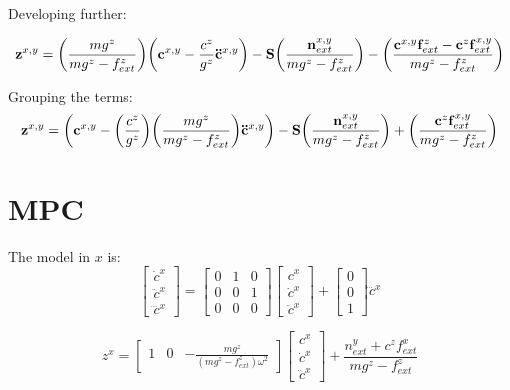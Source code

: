Developing further:

\begin{equation}
 \zmp^{x,y}
 =
 \left( \frac{m g^z}{m g^z - f^z_{ext}} \right)
 \left( \comP^{x,y} - \frac{c^z}{g^z} \comA^{x,y} \right)
 -
 \mathbf{S}
 \left( \frac{\tExt^{x,y} }{mg^z - f^z_{ext}} \right)
 -
 \left( \frac{\comP^{x,y}\fExt^z - \comP^z\fExt^{x,y}}{mg^z - f^z_{ext}} \right)
\end{equation}

Grouping the terms:
\begin{equation}
 \zmp^{x,y}
 =
 \left( \comP^{x,y} - \left( \frac{c^z}{g^z} \right) \left( \frac{m g^z }{m g^z - f^z_{ext}} \right) \comA^{x,y}  \right)
 -
 \mathbf{S}
 \left( \frac{\tExt^{x,y} }{mg^z - f^z_{ext}} \right)
 +
 \left( \frac{\comP^z\fExt^{x,y}}{mg^z - f^z_{ext}} \right)
\end{equation}

\section{MPC}
The model in $x$ is:
\begin{equation}
 \begin{bmatrix}
 \dot{c}^x \\
 \ddot{c}^x \\
 \dddot{c}^x
 \end{bmatrix}
 =
 \begin{bmatrix}
  0 & 1 & 0 \\
  0 & 0 & 1 \\
  0 & 0 & 0
 \end{bmatrix}
 \begin{bmatrix}
 c^x \\
 \dot{c}^x \\
 \ddot{c}^x
 \end{bmatrix}
 +
 \begin{bmatrix}
 0 \\
 0 \\
 1
 \end{bmatrix}
 \dddot{c}^x
\end{equation}

\begin{equation}
 z^x
 =
 \begin{bmatrix}
 1 &
 0 &
 -\frac{m g^z}{(m g^z - f^z_{ext} ) \omega^2}
 \end{bmatrix}
 \begin{bmatrix}
 c^x \\
 \dot{c}^x \\
 \ddot{c}^x
 \end{bmatrix}
 +
 \frac{n^y_{ext} + c^z f^x_{ext}}{mg^z - f^z_{ext}}
\end{equation}

